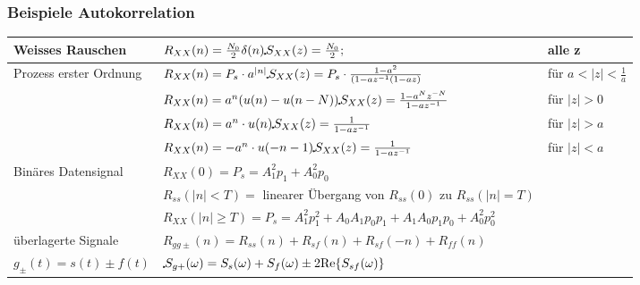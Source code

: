 \subsubsection{Beispiele Autokorrelation}
\begin{tabular}{|l|l|l|}
    \hline
        Weisses Rauschen
        & $R_{XX} (n) = \frac {N_0}{2} \delta(n) \FT S_{XX}(z)= \frac {N_0}{2};\hspace{0.25cm}$ & alle z\\
    \hline
        Prozess erster Ordnung
        & $R_{XX} (n) = P_s \cdot a^{|n|} \FT S_{XX} (z) = P_s \cdot \frac {1-a^2}{(1-az^{-1}(1-az)}$ & für $a<|z| < \frac{1}{a}$\\
    \hline
        
        & $R_{XX} (n) = a^n(u(n) - u(n-N)) \FT S_{XX} (z) = \frac{1-a^Nz^{-N}}{1-az^{-1}}$ & für $|z| > 0$\\
    \hline
        
        & $R_{XX} (n) = a^n \cdot u(n) \FT S_{XX} (z) = \frac{1}{1-az^{-1}}$ & für $|z| > a$\\
    \hline
        
        & $R_{XX} (n) = -a^n \cdot u(-n-1) \FT S_{XX} (z) = \frac{1}{1-az^{-1}}$ & für $|z| < a$\\
    \hline
        Binäres Datensignal
        & $R_{XX} (0) = P_s = A_1^2p_1 + A_0^2 p_0 $ &\\
        &$R_{ss} (|n| < T) = $ linearer Übergang von $R_{ss}(0)$ zu $R_{ss} (|n| = T)$ &\\
        & $R_{XX} (|n| \geq T) = P_s = A_1^2p_1^2 + A_0A_1p_0p_1 + A_1A_0p_1p_0 + A_0^2p_0^2$ &  \\
    \hline
        überlagerte Signale
        & $R_{gg\pm}(n) = R_{ss}(n) + R_{sf}(n) + R_{sf}(-n) + R_{ff}(n) $ &\\
        $g_\pm(t) = s(t) \pm f(t)$
        &  $\FT S_{g+}(\omega) = S_{s}(\omega) + S_{f}(\omega) \pm 2 \text{Re} \{S_{sf}(\omega) \}$ &\\ 
    \hline
\end{tabular} 
\vspace{-0.5cm}
